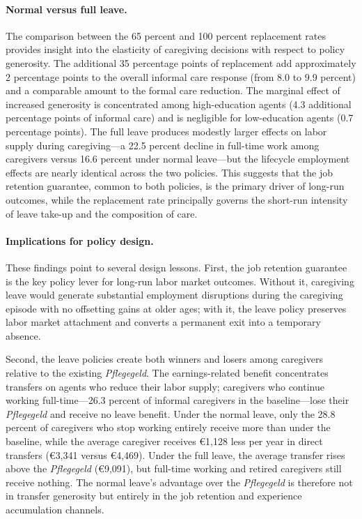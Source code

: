 \paragraph{Normal versus full leave.} The comparison between the 65 percent and 100 percent replacement rates provides insight into the elasticity of caregiving decisions with respect to policy generosity. The additional 35 percentage points of replacement add approximately 2 percentage points to the overall informal care response (from 8.0 to 9.9 percent) and a comparable amount to the formal care reduction. The marginal effect of increased generosity is concentrated among high-education agents (4.3 additional percentage points of informal care) and is negligible for low-education agents (0.7 percentage points). The full leave produces modestly larger effects on labor supply during caregiving---a 22.5 percent decline in full-time work among caregivers versus 16.6 percent under normal leave---but the lifecycle employment effects are nearly identical across the two policies. This suggests that the job retention guarantee, common to both policies, is the primary driver of long-run outcomes, while the replacement rate principally governs the short-run intensity of leave take-up and the composition of care.

\paragraph{Implications for policy design.} These findings point to several design lessons. First, the job retention guarantee is the key policy lever for long-run labor market outcomes. Without it, caregiving leave would generate substantial employment disruptions during the caregiving episode with no offsetting gains at older ages; with it, the leave policy preserves labor market attachment and converts a permanent exit into a temporary absence.

Second, the leave policies create both winners and losers among caregivers relative to the existing \textit{Pflegegeld}. The earnings-related benefit concentrates transfers on agents who reduce their labor supply; caregivers who continue working full-time---26.3 percent of informal caregivers in the baseline---lose their \textit{Pflegegeld} and receive no leave benefit. Under the normal leave, only the 28.8 percent of caregivers who stop working entirely receive more than under the baseline, while the average caregiver receives \euro{1,128} less per year in direct transfers (\euro{3,341} versus \euro{4,469}). Under the full leave, the average transfer rises above the \textit{Pflegegeld} (\euro{9,091}), but full-time working and retired caregivers still receive nothing. The normal leave's advantage over the \textit{Pflegegeld} is therefore not in transfer generosity but entirely in the job retention and experience accumulation channels.

